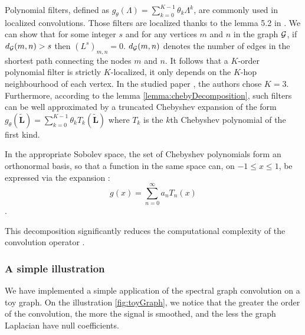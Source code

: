 Polynomial filters, defined as $g_\theta(\Lambda) = \sum_{k=0}^{K-1}\theta_k\Lambda^k$, are commonly used in localized convolutions. Those filters are localized thanks to the lemma 5.2 in \cite{hammond_wavelets_2011}. We can show that for some integer $s$ and for any 
vertices $m$ and $n$ in the graph $\mathcal{G}$, if $d_{\mathcal{G}}(m, n) > s$ then $(L^s)_{m, n} = 0$. $d_{\mathcal{G}}(m, n)$ denotes the number of edges in the shortest path connecting the nodes $m$ and $n$.
It follows that a $K$-order polynomial filter is strictly $K$-localized, \ie it only depends on the $K$-hop neighbourhood of each vertex. In the studied paper \cite{Parisot17}, the authors chose $K=3$.\\ 
Furthermore, according to the lemma \ref{lemma:chebyDecomposition}, such filters can be well approximated by a truncated Chebyshev expansion of the form $g_\theta(\widetilde{\mathbf{L}}) = \sum_{k=0}^{K-1}\theta_kT_k(\widetilde{\mathbf{L}})$ where $T_k$ is the $k$th Chebyshev polynomial of the first kind.
\begin{lemma}\label{lemma:chebyDecomposition}
    In the appropriate Sobolev space, the set of Chebyshev polynomials form an orthonormal basis, so that a function in the same space can, on $-1\leq x \leq 1$, be expressed via the expansion : $$g(x) = \sum_{n=0}^{\infty} a_nT_n(x)$$.
\end{lemma}
This decomposition significantly reduces the computational complexity of the convolution operator \cite{Parisot17}.


\subsubsection{A simple illustration}

We have implemented a simple application of the spectral graph convolution on a toy graph. 
On the illustration \ref{fig:toyGraph}, we notice that the greater the order of the convolution,  the more the signal is smoothed, and the less the graph Laplacian have null coefficients.

